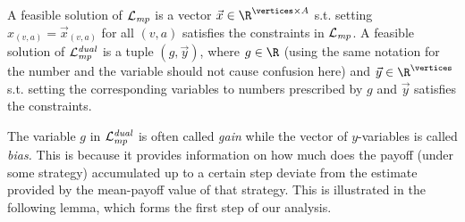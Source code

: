 \begin{remark}[Nomenclature]
A feasible solution of $ \mathcal{L}_{\mathit{mp}} $ is a vector $\vec{x} \in \R^{\vertices\times \actions} $ s.t. setting $ x_{(v,a)}=\vec{x}_{(v,a)} $ for all $ (v,a) $ satisfies the constraints in $ \mathcal{L}_{\mathit{mp}} $. A feasible solution of $ \mathcal{L}_{\mathit{mp}}^{\mathit{dual}}  $ is a tuple $ (g,\vec{y}) $, where $ g\in\R $ (using the same notation for the number and the variable should not cause  confusion here) and $ \vec{y}\in \R^{\vertices}$ s.t. setting the corresponding variables to numbers prescribed by $ g $ and $ \vec{y} $ satisfies the constraints.
\end{remark}

The variable $g$ in $\mathcal{L}_{\mathit{mp}}^{\mathit{dual}}$ is often called \emph{gain} while the vector of $y$-variables is called \emph{bias.} This is because it provides information on how much does the payoff (under some strategy) accumulated up to a certain step deviate from the estimate provided by the mean-payoff value of that strategy. This is illustrated in the following lemma, which forms the first step of our analysis. 

